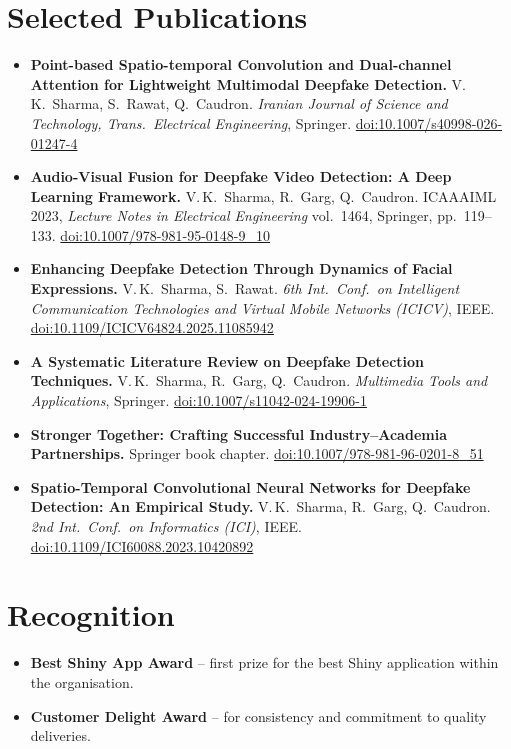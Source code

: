 \documentclass[a4paper,10pt]{article}
\newcommand{\pub}[2]{\item[\textbf{#1}] #2}
\begin{document}
\section{Selected Publications}
\begin{itemize}[leftmargin=2.7em,labelwidth=2.2em,align=left,itemsep=3pt]
  \pub{2026}{\textbf{Point-based Spatio-temporal Convolution and Dual-channel Attention for Lightweight Multimodal Deepfake Detection.} V.\,K.~Sharma, S.~Rawat, Q.~Caudron. \textit{Iranian Journal of Science and Technology, Trans.\ Electrical Engineering}, Springer. \href{https://doi.org/10.1007/s40998-026-01247-4}{doi:10.1007/s40998-026-01247-4}}
  \pub{2026}{\textbf{Audio-Visual Fusion for Deepfake Video Detection: A Deep Learning Framework.} V.\,K.~Sharma, R.~Garg, Q.~Caudron. ICAAAIML 2023, \textit{Lecture Notes in Electrical Engineering} vol.~1464, Springer, pp.~119--133. \href{https://doi.org/10.1007/978-981-95-0148-9_10}{doi:10.1007/978-981-95-0148-9\_10}}
  \pub{2025}{\textbf{Enhancing Deepfake Detection Through Dynamics of Facial Expressions.} V.\,K.~Sharma, S.~Rawat. \textit{6th Int.\ Conf.\ on Intelligent Communication Technologies and Virtual Mobile Networks (ICICV)}, IEEE. \href{https://doi.org/10.1109/ICICV64824.2025.11085942}{doi:10.1109/ICICV64824.2025.11085942}}
  \pub{2024}{\textbf{A Systematic Literature Review on Deepfake Detection Techniques.} V.\,K.~Sharma, R.~Garg, Q.~Caudron. \textit{Multimedia Tools and Applications}, Springer. \href{https://doi.org/10.1007/s11042-024-19906-1}{doi:10.1007/s11042-024-19906-1}}
  \pub{2024}{\textbf{Stronger Together: Crafting Successful Industry--Academia Partnerships.} Springer book chapter. \href{https://doi.org/10.1007/978-981-96-0201-8_51}{doi:10.1007/978-981-96-0201-8\_51}}
  \pub{2024}{\textbf{Spatio-Temporal Convolutional Neural Networks for Deepfake Detection: An Empirical Study.} V.\,K.~Sharma, R.~Garg, Q.~Caudron. \textit{2nd Int.\ Conf.\ on Informatics (ICI)}, IEEE. \href{https://doi.org/10.1109/ICI60088.2023.10420892}{doi:10.1109/ICI60088.2023.10420892}}
\end{itemize}

\section{Recognition}
\begin{itemize}
  \item \textbf{Best Shiny App Award} -- first prize for the best Shiny application within the organisation.
  \item \textbf{Customer Delight Award} -- for consistency and commitment to quality deliveries.
\end{itemize}
\end{document}
